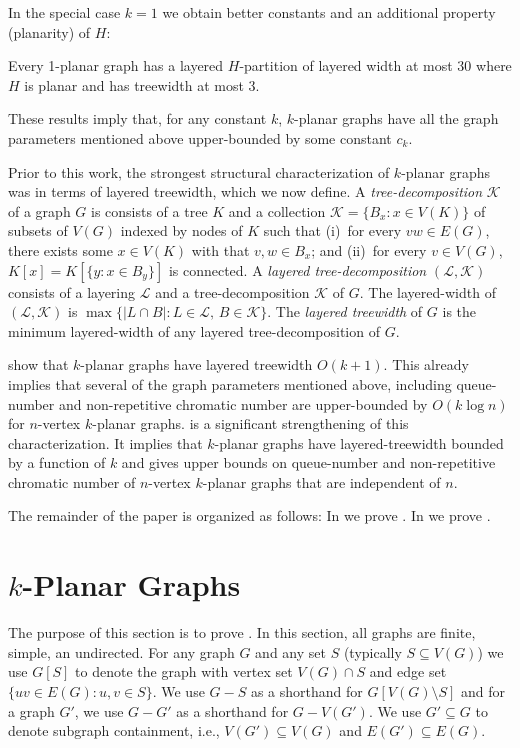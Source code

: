 \documentclass{patmorin}
\begin{document}
In the special case $k=1$ we obtain better constants and an additional property (planarity) of $H$:

\begin{thm}
  Every 1-planar graph has a layered $H$-partition of layered width at most 30 where $H$ is planar and has treewidth at most 3.
\end{thm}

These results imply that, for any constant $k$, $k$-planar graphs have all the graph parameters mentioned above upper-bounded by some constant $c_k$.

Prior to this work, the strongest structural characterization of $k$-planar graphs was in terms of layered treewidth, which we now define.  A \emph{tree-decomposition} $\mathcal{K}$ of a graph $G$ is consists of a tree $K$ and a collection $\mathcal{K}=\{B_x:x\in V(K)\}$ of subsets of $V(G)$ indexed by nodes of $K$ such that (i)~for every $vw\in E(G)$, there exists some $x\in V(K)$ with that $v,w\in B_x$; and (ii)~for every $v\in V(G)$, $K[x] = K[\{y: x\in B_y\}]$ is connected.  A \emph{layered tree-decomposition} $(\mathcal{L},\mathcal{K})$ consists of a layering $\mathcal{L}$ and a tree-decomposition $\mathcal{K}$ of $G$. The layered-width of $(\mathcal{L},\mathcal{K})$ is $\max\{|L\cap B|: L\in \mathcal{L},\, B\in \mathcal{K}\}$.  The \emph{layered treewidth} of $G$ is the minimum layered-width of any layered tree-decomposition of $G$.

\citet{dujmovic.eppstein.ea:structure} show that $k$-planar graphs have layered treewidth $O(k+1)$.  This already implies that several of the graph parameters mentioned above, including queue-number and non-repetitive chromatic number are upper-bounded by $O(k\log n)$ for $n$-vertex $k$-planar graphs.  is a significant strengthening of this characterization. It implies that $k$-planar graphs have layered-treewidth bounded by a function of $k$ and gives upper bounds on queue-number and non-repetitive chromatic number of $n$-vertex $k$-planar graphs that are independent of $n$.

The remainder of the paper is organized as follows: In  we prove .  In  we prove .  

\section{$k$-Planar Graphs}

The purpose of this section is to prove .  In this section, all graphs are finite, simple, an undirected.  For any graph $G$ and any set $S$ (typically $S\subseteq V(G)$) we use $G[S]$ to denote the graph with vertex set $V(G)\cap S$ and edge set $\{uv\in E(G) : u,v\in S\}$.  We use $G-S$ as a shorthand for $G[V(G)\setminus S]$ and for a graph $G'$, we use $G-G'$ as a shorthand for $G-V(G')$.  We use $G'\subseteq G$ to denote subgraph containment, i.e., $V(G')\subseteq V(G)$ and $E(G')\subseteq E(G)$.
\end{document}
